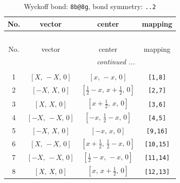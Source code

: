 \documentclass[fleqn,8pt]{jsarticle}
\begin{document}
\begin{longtable}{cccc}
\caption{Wyckoff bond: {\tt 8b@8g}, bond symmetry: {\tt ..2}}
 \\
 \hline \hline
No. & vector & center & mapping \\ \hline \endfirsthead

\multicolumn{3}{l}{\tablename\ \thetable{}} \\
 \hline \hline
No. & vector & center & mapping \\ \hline \endhead

 \hline \hline
\multicolumn{3}{r}{\footnotesize\it continued ...} \\ \endfoot

 \hline \hline
\multicolumn{3}{r}{} \\ \endlastfoot

1 & $\left[ X,\, - X,\, 0 \right]$ & $\left[ x,\, - x,\, 0 \right]$ & {\tt [1,8]} \\ \hline
2 & $\left[ - X,\, X,\, 0 \right]$ & $\left[ \frac{1}{2} - x,\, x + \frac{1}{2},\, 0 \right]$ & {\tt [2,7]} \\ \hline
3 & $\left[ X,\, X,\, 0 \right]$ & $\left[ x + \frac{1}{2},\, x,\, 0 \right]$ & {\tt [3,6]} \\ \hline
4 & $\left[ - X,\, - X,\, 0 \right]$ & $\left[ - x,\, \frac{1}{2} - x,\, 0 \right]$ & {\tt [4,5]} \\ \hline
5 & $\left[ - X,\, X,\, 0 \right]$ & $\left[ - x,\, x,\, 0 \right]$ & {\tt [9,16]} \\ \hline
6 & $\left[ X,\, - X,\, 0 \right]$ & $\left[ x + \frac{1}{2},\, \frac{1}{2} - x,\, 0 \right]$ & {\tt [10,15]} \\ \hline
7 & $\left[ - X,\, - X,\, 0 \right]$ & $\left[ \frac{1}{2} - x,\, - x,\, 0 \right]$ & {\tt [11,14]} \\ \hline
8 & $\left[ X,\, X,\, 0 \right]$ & $\left[ x,\, x + \frac{1}{2},\, 0 \right]$ & {\tt [12,13]} \\
\end{longtable}
\renewcommand{\arraystretch}{1.2}
\end{document}

